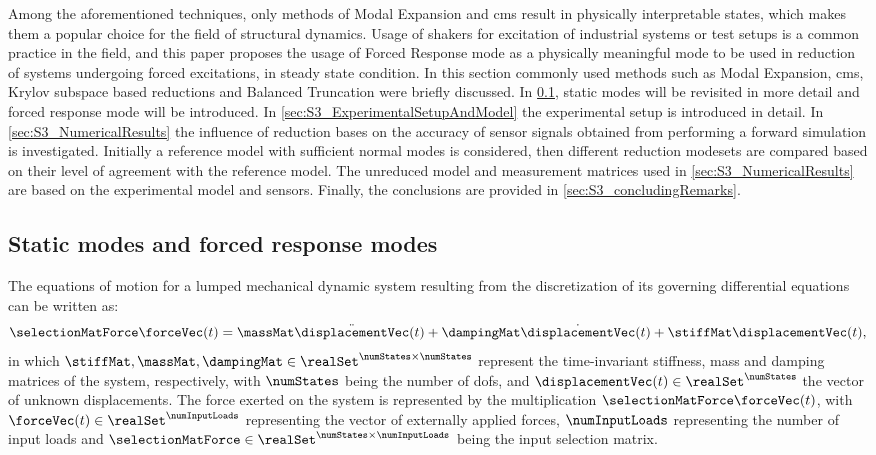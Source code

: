 Among the aforementioned techniques, only methods of Modal Expansion and \gls{cms} result in physically interpretable states, which makes them a popular choice for the field of structural dynamics. Usage of shakers for excitation of industrial systems or test setups is a common practice in the field, and this paper proposes the usage of Forced Response mode as a physically meaningful mode to be used in reduction of systems undergoing forced excitations, in steady state condition. In this section commonly used methods such as Modal Expansion, \gls{cms}, Krylov subspace based reductions and Balanced Truncation were briefly discussed. In \cref{sec:S3_staticModesAndForcedResponseModes}, static modes will be revisited in more detail and forced response mode will be introduced. In \cref{sec:S3_ExperimentalSetupAndModel} the experimental setup is introduced in detail. In \cref{sec:S3_NumericalResults} the influence of reduction bases on the accuracy of sensor signals obtained from performing a forward simulation is investigated. Initially a reference model with sufficient normal modes is considered, then different reduction modesets are compared based on their level of agreement with the reference model. The unreduced model and measurement matrices used in \cref{sec:S3_NumericalResults} are based on the experimental model and sensors. Finally, the conclusions are provided in \cref{sec:S3_concludingRemarks}.



\subsection{Static modes and forced response modes}
\label{sec:S3_staticModesAndForcedResponseModes}

The equations of motion for a lumped mechanical dynamic system resulting from the discretization of its governing differential equations can be written as:
\begin{align}
    \selectionMatForce \forceVec (t) = \massMat \ddot{\displacementVec}(t) + \dampingMat \dot{\displacementVec}(t) + \stiffMat \displacementVec (t),
    \label{eq:S3_eom}
\end{align}
in which \(\stiffMat,\massMat,\dampingMat \in \realSet^{\numStates \times \numStates}\) represent the time-invariant stiffness, mass and damping matrices of the system, respectively, with \(\numStates\) being the number of \glspl{dof}, and \(\displacementVec(t) \in \realSet^{\numStates}\) the vector of unknown displacements. The force exerted on the system is represented by the multiplication \(\selectionMatForce \forceVec (t)\), with \(\forceVec (t) \in \realSet^{\numInputLoads}\) representing the vector of externally applied forces, \(\numInputLoads\) representing the number of input loads and \(\selectionMatForce \in \realSet^{\numStates \times \numInputLoads}\) being the input selection matrix.

